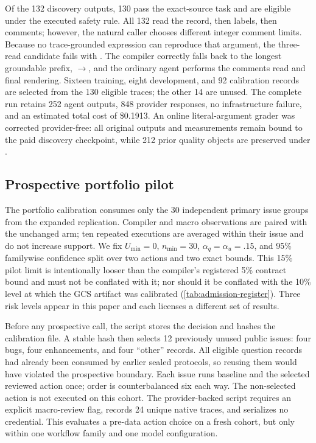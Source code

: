 Of the 132 discovery outputs, 130 pass the exact-source task and are eligible under the
executed safety rule.  All 132 read the record, then labels, then comments; however, the natural
caller chooses different integer comment limits.  Because no trace-grounded expression
can reproduce that argument, the three-read candidate fails with
.  The compiler correctly falls back to the longest groundable
prefix, $\rightarrow$, and the ordinary agent performs the
comments read and final rendering.  Sixteen training, eight development, and 92 calibration
records are selected from the 130 eligible traces; the other 14 are unused.  The complete
run retains 252 agent outputs, 848 provider responses, no infrastructure failure, and an
estimated total cost of \$0.1913.  An online literal-argument grader was corrected
provider-free: all original outputs and measurements remain bound to the paid discovery
checkpoint, while 212 prior quality objects are preserved under
.

\subsection{Prospective portfolio pilot}
\label{sec:portfolio-methodology}

The portfolio calibration consumes only the 30 independent primary issue groups from the
expanded replication.  Compiler and macro observations are paired with the unchanged arm;
ten repeated executions are averaged within their issue and do not increase support.  We
fix $U_{\min}=0$, $n_{\min}=30$, $\alpha_q=\alpha_u=.15$, and 95\% familywise confidence
split over two actions and two exact bounds.  This 15\% pilot limit is intentionally looser
than the compiler's registered 5\% contract bound and must not be conflated with it; nor
should it be conflated with the 10\% level at which the GCS artifact was calibrated
(\cref{tab:admission-register}).  Three risk levels appear in this paper and each licenses
a different set of results.

Before any prospective call, the script stores the decision and hashes the calibration
file.  A stable hash then selects 12 previously unused public issues: four bugs, four
enhancements, and four ``other'' records.  All eligible question records had already been
consumed by earlier sealed protocols, so reusing them would have violated the prospective
boundary.  Each issue runs baseline and the selected reviewed action once; order is
counterbalanced six each way.  The non-selected action is not executed on this cohort.
The provider-backed script requires an explicit macro-review flag, records 24 unique native
traces, and serializes no credential.  This evaluates a pre-data action choice on a fresh
cohort, but only within one workflow family and one model configuration.

